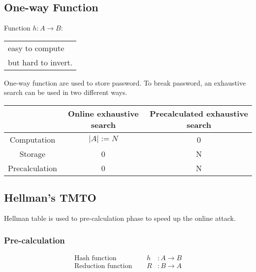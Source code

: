 \subsection{One-way Function} 

\begin{center}
    Function $h: A \rightarrow B$: 
    \begin{tabular}{l}
        easy to compute \\
        but hard to invert.
    \end{tabular}
\end{center}

One-way function are used to store password. To break password, an exhaustive
search can be used in two different ways.
\begin{table}[ht!]
    \centering
    \begin{tabular}{|c|c|c|}
        \hline
        & Online exhaustive search & Precalculated exhaustive search \\
        \hline
        Computation & $ |A|:=N $ & 0 \\
        Storage & 0 & N \\
        Precalculation & 0 & N \\
        \hline
    \end{tabular}
\end{table}

\subsection{Hellman's TMTO}
Hellman table is used to pre-calculation phase to speed up the online attack.

\subsubsection{Pre-calculation}

\begin{eqnarray*}
    \textrm{Hash function } \quad & h &: A \to B \\
    \textrm{Reduction function } \quad & R &: B \to A 
\end{eqnarray*}

